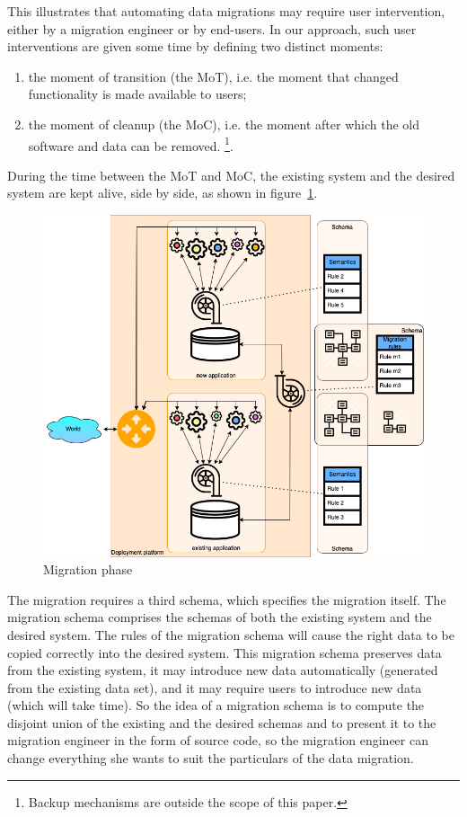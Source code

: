 \documentclass{elsarticle}
\begin{document}
   This illustrates that automating data migrations may require user intervention,
   either by a migration engineer or by end-users.
   In our approach, such user interventions are given some time by
   defining two distinct moments:
\begin{enumerate}
   \item the moment of transition (the MoT), i.e. the moment that changed functionality is made available to users;
   \item the moment of cleanup (the MoC), i.e. the moment after which the old software and data can be removed.%
\footnote{Backup mechanisms are outside the scope of this paper.}.
\end{enumerate}

   During the time between the MoT and MoC,
   the existing system and the desired system are kept alive, side by side, as shown in figure~\ref{fig:migration phase}.
\begin{figure}[bht]
   \begin{center}
     \includegraphics[scale=.35]{figures/datamigration-Migration phase.png}
   \end{center}
\caption{Migration phase}
\label{fig:migration phase}
\end{figure}

   The migration requires a third schema, which specifies the migration itself.
   The migration schema comprises the schemas of both the existing system and the desired system.
   The rules of the migration schema will cause the right data to be copied correctly into the desired system.
   This migration schema preserves data from the existing system, it may introduce new data automatically (generated from the existing data set),
   and it may require users to introduce new data (which will take time). 
   So the idea of a migration schema is to compute the disjoint union of the existing and the desired schemas
   and to present it to the migration engineer in the form of source code,
   so the migration engineer can change everything she wants to suit the particulars of the data migration.
\end{document}
